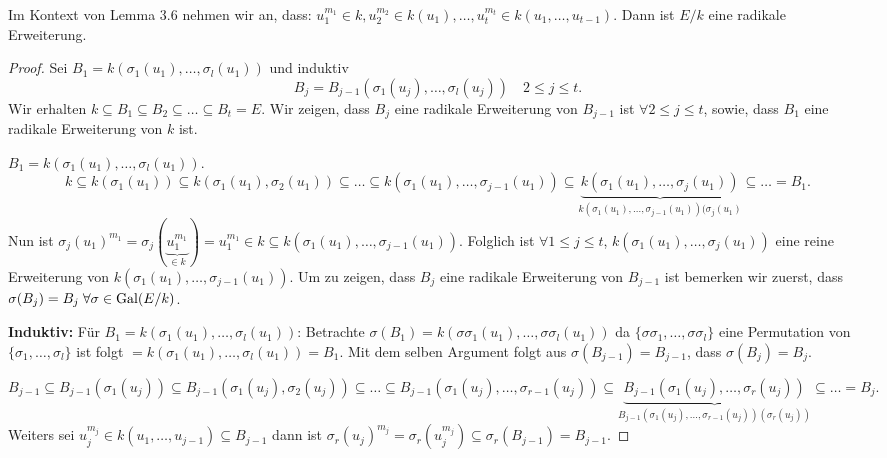 \begin{lemma}
	Im Kontext von Lemma 3.6 nehmen wir an, dass: $u_1^{m_1} \in k, u_2^{m_2} \in k(u_1),\ldots, u_{t}^{m_{t}} \in k(u_1,\ldots,u_{t-1})$.
	Dann ist $E / k$ eine radikale Erweiterung.
\end{lemma}

\begin{proof}
	Sei $B_1 = k(\sigma_1(u_1),\ldots,\sigma_{l}(u_{1}))$ und induktiv
	\[
		B_{j} = B_{j-1}(\sigma_1(u_{j}),\ldots,\sigma_{l}(u_{j})) \quad 2 \leq j \leq t
	.\] 
	Wir erhalten $k \subseteq B_1 \subseteq B_2 \subseteq \ldots \subseteq B_{t} = E$.
	Wir zeigen, dass $B_{j}$ eine radikale Erweiterung von $B_{j-1}$ ist $\forall 2 \leq j \leq t$,
	sowie, dass $B_1$ eine radikale Erweiterung von $k$ ist.

	$B_{1} = k(\sigma_1(u_1),\ldots,\sigma_{l}(u_1))$.
	\[
		k \subseteq k(\sigma_1(u_1)) \subseteq k(\sigma_1(u_1),\sigma_2(u_1)) \subseteq \ldots \subseteq k(\sigma_1(u_1),\ldots,\sigma_{j-1}(u_1))
		\subseteq \underbrace{k(\sigma_1(u_1),\ldots,\sigma_{j}(u_1))}_{k(\sigma_1(u_1),\ldots,\sigma_{j-1}(u_1))(\sigma_{j}(u_1)} \subseteq \ldots = B_1
	.\] 
	Nun ist $\sigma_{j}(u_1)^{m_1} = \sigma_{j}(\underbrace{u_1^{m_1}}_{\in k}) = u_1^{m_1} \in k \subseteq k(\sigma_1(u_1),\ldots,\sigma_{j-1}(u_1))$.
	Folglich ist $\forall 1 \leq j \leq t$, $k(\sigma_{1}(u_1),\ldots,\sigma_{j}(u_1))$ eine reine Erweiterung von $k(\sigma_1(u_1),\ldots,\sigma_{j-1}(u_1))$.
	Um zu zeigen, dass $B_{j}$ eine radikale Erweiterung von $B_{j-1}$ ist bemerken wir zuerst, dass $\sigma(B_{j}) = B_{j} \forall \sigma \in \gal(E / k)$.

	\textbf{Induktiv:} Für $B_1 = k(\sigma_1(u_1),\ldots,\sigma_{l}(u_1))$: Betrachte $\sigma(B_1) = k(\sigma \sigma_1(u_1),\ldots, \sigma \sigma_{l}(u_1))$ 
	da $\{\sigma \sigma_1,\ldots,\sigma \sigma_{l}\}$ eine Permutation von $\{\sigma_1,\ldots,\sigma_{l}\}$ ist folgt $= k(\sigma_1(u_1),\ldots,\sigma_{l}(u_1)) = B_1$.
	Mit dem selben Argument folgt aus $\sigma(B_{j-1}) = B_{j-1}$, dass $\sigma(B_{j}) = B_{j}$.

	\[
		B_{j-1} \subseteq B_{j-1}(\sigma_1(u_{j})) \subseteq B_{j-1}(\sigma_1(u_{j}),\sigma_2(u_{j})) \subseteq \ldots \subseteq B_{j-1}(\sigma_1(u_{j}),\ldots,\sigma_{r-1}(u_{j}))
		\subseteq \underbrace{B_{j-1}(\sigma_1(u_{j}),\ldots,\sigma_{r}(u_{j}))}_{B_{j-1}(\sigma_1(u_{j}),\ldots,\sigma_{r-1}(u_{j}))(\sigma_{r}(u_{j}))} \subseteq \ldots = B_{j}
	.\] 
	Weiters sei $u_{j}^{m_{j}} \in k(u_1,\ldots,u_{j-1}) \subseteq B_{j-1}$ dann ist
	$\sigma_{r}(u_{j})^{m_{j}} = \sigma_{r}(u_{j}^{m_{j}}) \subseteq \sigma_{r}(B_{j-1}) = B_{j-1}$.
\end{proof}

